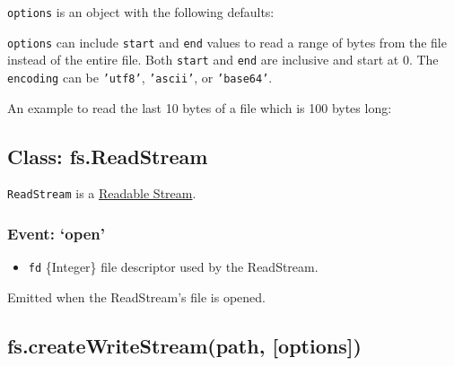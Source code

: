 \texttt{options} is an object with the following defaults:

\begin{Shaded}
\begin{Highlighting}[]
\NormalTok{\{ }\NormalTok{: }\NormalTok{,}
  \NormalTok{: }\NormalTok{,}
  \NormalTok{: } \NormalTok{* }
\NormalTok{\}}
\end{Highlighting}
\end{Shaded}

\texttt{options} can include \texttt{start} and \texttt{end} values to
read a range of bytes from the file instead of the entire file. Both
\texttt{start} and \texttt{end} are inclusive and start at 0. The
\texttt{encoding} can be \texttt{'utf8'}, \texttt{'ascii'}, or
\texttt{'base64'}.

An example to read the last 10 bytes of a file which is 100 bytes long:

\begin{Shaded}
\begin{Highlighting}[]
\NormalTok{(}\NormalTok{, \{}\NormalTok{: }\NormalTok{, }\NormalTok{: }\NormalTok{\});}
\end{Highlighting}
\end{Shaded}

\subsection{Class: fs.ReadStream}

\texttt{ReadStream} is a
\href{stream.html\#stream\_readable\_stream}{Readable Stream}.

\subsubsection{Event: `open'}

\begin{itemize}
\item
  \texttt{fd} \{Integer\} file descriptor used by the ReadStream.
\end{itemize}

Emitted when the ReadStream's file is opened.

\subsection{fs.createWriteStream(path, {[}options{]})}

